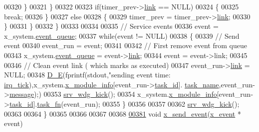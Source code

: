 \begin{DoxyCode}
{{00320                  \}
00321             \}
00322 
00323             \textcolor{keywordflow}{if}(timer\_prev->\hyperlink{a00036_ac1b431c0d2de68ce090f223b32f212b5}{link} == NULL)
00324             \{
00325                 \textcolor{keywordflow}{break};
00326             \}
00327             \textcolor{keywordflow}{else}
00328             \{
00329                 timer\_prev = timer\_prev->\hyperlink{a00036_ac1b431c0d2de68ce090f223b32f212b5}{link};
00330             \}
00331         \}
00332     \}
00333 
00334 
00335     \textcolor{comment}{// Service events}
00336     \textcolor{keyword}{event} = x\_system.\hyperlink{a00037_aae3e0af6b968bca8cea3ebff4b8918cb}{event\_queue};
00337     \textcolor{keywordflow}{while}(event != NULL)
00338     \{
00339         \textcolor{comment}{// Send event}
00340         event\_run = event;
00341 
00342         \textcolor{comment}{// First remove event from queue}
00343         x\_system.\hyperlink{a00037_aae3e0af6b968bca8cea3ebff4b8918cb}{event\_queue} = \textcolor{keyword}{event}->\hyperlink{a00036_aab03e4ec45a7b861ab6ed51f64f58fda}{link};
00344         \textcolor{keyword}{event} = \textcolor{keyword}{event}->link;
00345 
00346         \textcolor{comment}{// Clean event link ( which marks as executed)}
00347         event\_run->\hyperlink{a00036_aab03e4ec45a7b861ab6ed51f64f58fda}{link} = NULL;
00348         \hyperlink{a00040_ae8251f649f2077b9d0de5a10e6c2cf79}{D\_E}(fprintf(stdout,\textcolor{stringliteral}{"sending event time:%
      \hyperlink{a00037_ab73fa103937ad39e7e2fc55783c4c370}{irq\_tick}),x\_system.\hyperlink{a00037_a6724d1e1430a0e89c134b30152988385}{x\_module\_info}[event\_run->\hyperlink{a00036_a21b41e494a28583d4da10f1afb1c5328}{task\_id}].
      \hyperlink{a00037_a530a0539bc1522a85f661b6e1c9ebebd}{task\_name},event\_run->\hyperlink{a00036_adf9665938515a20c283eea2c978cf80d}{message});)
00353         \hyperlink{a00067_a710d148845397582739d170341f3d3d9}{srv\_wdg\_kick}();
00354         x\_system.\hyperlink{a00037_a6724d1e1430a0e89c134b30152988385}{x\_module\_info}[event\_run->\hyperlink{a00036_a21b41e494a28583d4da10f1afb1c5328}{task\_id}].\hyperlink{a00037_ab14ce9c8fe0edb516f7f3d4e1e3a8854}{task\_fn}(event\_run);
00355     \}
00356 
00357 
00362     \hyperlink{a00067_a710d148845397582739d170341f3d3d9}{srv\_wdg\_kick}();
00363 
00364 \}
00365 
00366 
00367 
00368 
\hypertarget{a00037_source_l00381}{}\hyperlink{a00037_a4bc3d03c8d62c8237329ed4e969fbc1b}{00381} \textcolor{keywordtype}{void}  \hyperlink{a00037_a4bc3d03c8d62c8237329ed4e969fbc1b}{x\_send\_event}(\hyperlink{a00036_de/d37/a00849}{x\_event} * event)
}}}
\end{DoxyCode}
